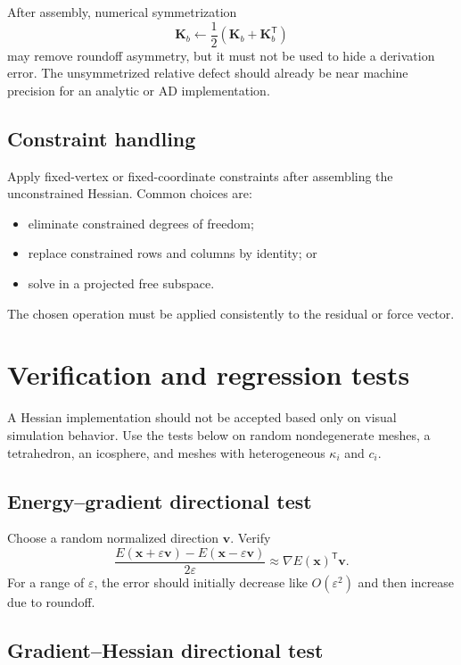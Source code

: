 \documentclass[11pt]{article}
\newcommand{\T}{\mathsf{T}}
\newcommand{\grad}{\nabla}
\newcommand{\x}{\mathbf{x}}
\newcommand{\vct}{\mathbf{v}}
\newcommand{\Kmat}{\mathbf{K}}
\begin{document}
After assembly, numerical symmetrization
\begin{equation}
  \Kmat_b\leftarrow\frac{1}{2}(\Kmat_b+\Kmat_b^\T)
\end{equation}
may remove roundoff asymmetry, but it must not be used to hide a derivation error.  The unsymmetrized relative defect should already be near machine precision for an analytic or AD implementation.

\subsection{Constraint handling}

Apply fixed-vertex or fixed-coordinate constraints after assembling the unconstrained Hessian.  Common choices are:
\begin{itemize}
  \item eliminate constrained degrees of freedom;
  \item replace constrained rows and columns by identity; or
  \item solve in a projected free subspace.
\end{itemize}
The chosen operation must be applied consistently to the residual or force vector.

\section{Verification and regression tests}

A Hessian implementation should not be accepted based only on visual simulation behavior.  Use the tests below on random nondegenerate meshes, a tetrahedron, an icosphere, and meshes with heterogeneous $\kappa_i$ and $c_i$.

\subsection{Energy--gradient directional test}

Choose a random normalized direction $\vct$.  Verify
\begin{equation}
  \frac{E(\x+\varepsilon\vct)-E(\x-\varepsilon\vct)}{2\varepsilon}
  \approx
  \grad E(\x)^\T\vct.
  \label{eq:grad-test}
\end{equation}
For a range of $\varepsilon$, the error should initially decrease like $O(\varepsilon^2)$ and then increase due to roundoff.

\subsection{Gradient--Hessian directional test}
\end{document}
